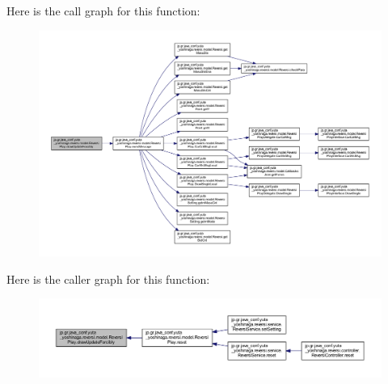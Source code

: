 Here is the call graph for this function\+:
\nopagebreak
\begin{figure}[H]
\begin{center}
\leavevmode
\includegraphics[width=350pt]{classjp_1_1gr_1_1java__conf_1_1yuta__yoshinaga_1_1reversi_1_1model_1_1_reversi_play_a216cece80255198785a95ccbaf1cef53_cgraph}
\end{center}
\end{figure}
Here is the caller graph for this function\+:
\nopagebreak
\begin{figure}[H]
\begin{center}
\leavevmode
\includegraphics[width=350pt]{classjp_1_1gr_1_1java__conf_1_1yuta__yoshinaga_1_1reversi_1_1model_1_1_reversi_play_a216cece80255198785a95ccbaf1cef53_icgraph}
\end{center}
\end{figure}
\mbox{\label{classjp_1_1gr_1_1java__conf_1_1yuta__yoshinaga_1_1reversi_1_1model_1_1_reversi_play_a8c5c00aeb6656d7806416ac577b77e3b}} 
